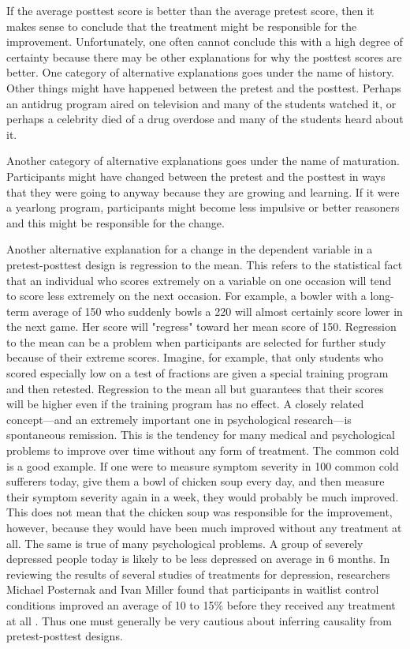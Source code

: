 If the average posttest score is better than the average pretest score, then it makes sense to conclude that the treatment might be responsible for the improvement. Unfortunately, one often cannot conclude this with a high degree of certainty because there may be other explanations for why the posttest scores are better. One category of alternative explanations goes under the name of history. Other things might have happened between the pretest and the posttest. Perhaps an antidrug program aired on television and many of the students watched it, or perhaps a celebrity died of a drug overdose and many of the students heard about it.

Another category of alternative explanations goes under the name of maturation. Participants might have changed between the pretest and the posttest in ways that they were going to anyway because they are growing and learning. If it were a yearlong program, participants might become less impulsive or better reasoners and this might be responsible for the change.

Another alternative explanation for a change in the dependent variable in a pretest-posttest design is regression to the mean. This refers to the statistical fact that an individual who scores extremely on a variable on one occasion will tend to score less extremely on the next occasion. For example, a bowler with a long-term average of 150 who suddenly bowls a 220 will almost certainly score lower in the next game. Her score will "regress" toward her mean score of 150. Regression to the mean can be a problem when participants are selected for further study because of their extreme scores. Imagine, for example, that only students who scored especially low on a test of fractions are given a special training program and then retested. Regression to the mean all but guarantees that their scores will be higher even if the training program has no effect. A closely related concept---and an extremely important one in psychological research---is spontaneous remission. This is the tendency for many medical and psychological problems to improve over time without any form of treatment. The common cold is a good example. If one were to measure symptom severity in 100 common cold sufferers today, give them a bowl of chicken soup every day, and then measure their symptom severity again in a week, they would probably be much improved. This does not mean that the chicken soup was responsible for the improvement, however, because they would have been much improved without any treatment at all. The same is true of many psychological problems. A group of severely depressed people today is likely to be less depressed on average in 6 months. In reviewing the results of several studies of treatments for depression, researchers Michael Posternak and Ivan Miller found that participants in waitlist control conditions improved an average of 10 to 15\% before they received any treatment at all \citep{posternak_untreated_2001}. Thus one must generally be very cautious about inferring causality from pretest-posttest designs.

